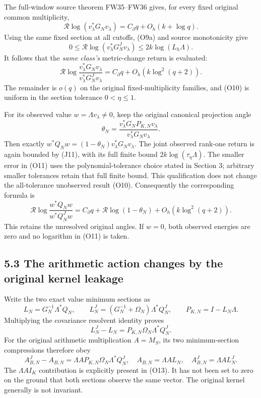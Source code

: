 \documentclass[11pt]{article}
\begin{document}
The full-window source theorem FW35--FW36 gives, for every fixed original common multiplicity, \[
 \mathcal R\log(v_\lambda^*G_Nv_\lambda)
 =C_\partial q+O_h(k+\log q). \tag{O9}
\] Using the same fixed section at all cutoffs, (O9a) and source monotonicity give \[
 0\le\mathcal R\log(v_\lambda^*G_N^Jv_\lambda)
 \le2k\log(L_h\Lambda).
\] It follows that the \emph{same class's} metric-change return is evaluated: \[
 \boxed{
 \mathcal R\log
 \frac{v_\lambda^*G_Nv_\lambda}
      {v_\lambda^*G_N^Jv_\lambda}
 =C_\partial q+O_h(k\log^2(q+2)).
 } \tag{O10}
\] The remainder is \(o(q)\) on the original fixed-multiplicity families, and (O10) is uniform in the section tolerance \(0<\eta\le1\).

For its observed value \(w=\Lambda v_\lambda\ne0\), keep the original canonical projection angle \[
 \theta_N=\frac{v_\lambda^*G_NP_{K,N}v_\lambda}
 {v_\lambda^*G_Nv_\lambda}.
\] Then exactly \(w^*Q_Nw=(1-\theta_N)v_\lambda^*G_Nv_\lambda\). The joint observed rank-one return is again bounded by (J11), with its full finite bound \(2k\log(\tau_\eta\Lambda)\). The smaller error in (O11) uses the polynomial-tolerance choice stated in Section 3; arbitrary smaller tolerances retain that full finite bound. This qualification does not change the all-tolerance unobserved result (O10). Consequently the corresponding formula is \[
 \boxed{
 \mathcal R\log\frac{w^*Q_Nw}{w^*Q_N^Jw}
 =C_\partial q+\mathcal R\log(1-\theta_N)
 +O_h(k\log^2(q+2)).
 } \tag{O11}
\] This retains the unresolved original angles. If \(w=0\), both observed energies are zero and no logarithm in (O11) is taken.

\subsection{5.3 The arithmetic action changes by the original kernel leakage}\label{the-arithmetic-action-changes-by-the-original-kernel-leakage}

Write the two exact value minimum sections as \[
 L_N=G_N^{-1}\Lambda^*Q_N,\qquad
 L_N^J=(G_N^{-1}+\Omega_N)\Lambda^*Q_N^J,\qquad
 P_{K,N}=I-L_N\Lambda.
\] Multiplying the covariance resolvent identity proves \[
 \boxed{
 L_N^J-L_N=P_{K,N}\Omega_N\Lambda^*Q_N^J.
 } \tag{O12}
\] For the original arithmetic multiplication \(A=M_S\), its two minimum-section compressions therefore obey \[
 \boxed{
 A_{B,N}^J-A_{B,N}
 =\Lambda A P_{K,N}\Omega_N\Lambda^*Q_N^J,
 \quad A_{B,N}=\Lambda A L_N,\quad A_{B,N}^J=\Lambda A L_N^J.
 } \tag{O13}
\] The \(\Lambda A I_K\) contribution is explicitly present in (O13). It has not been set to zero on the ground that both sections observe the same vector. The original kernel generally is not invariant.
\end{document}
